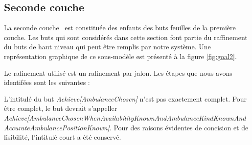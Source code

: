 	\noindent{}
	
\newpage
\subsection{Seconde couche}
	
	La \og seconde couche \fg\ est constituée des enfants des buts
	feuilles de la première couche. Les buts qui sont considérés dans
	cette section font partie du raffinement du buts de haut niveau
	qui peut être remplis par notre système. Une représentation 
	graphique de ce sous-modèle est présenté à la figure \ref{fig:goal2}.
	
	Le rafinement utilisé est un rafinement par jalon. Les étapes que nous
	avons identifées sont les suivantes :
	
	\noindent{}
	
	L'intitulé du but \textit{Achieve[AmbulanceChosen]} n'est pas 
	exactement complet. Pour être complet, le but devrait s'appeller
	\textit{Achieve[\-Ambulance\-Chosen\-When\-Availability\-Known\-And\-Ambulance\-Kind\-Known\-And\-Accurate\-Ambulance\-Position\-Known]}. Pour des raisons évidentes 
	de concision et de lisibilité, l'intitulé court a été conservé.

